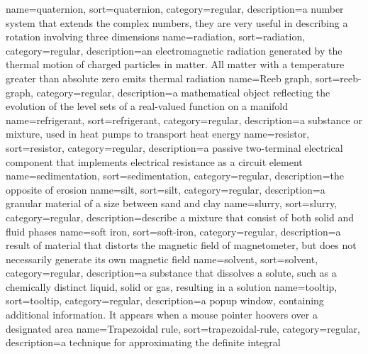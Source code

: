 %
{%
  name={quaternion},%
  sort={quaternion},%
  category={regular},%
  description={a number system that extends the complex numbers, they are very useful in describing a rotation involving three dimensions}%
}
%
{%
  name={radiation},%
  sort={radiation},%
  category={regular},%
  description={an electromagnetic radiation generated by the thermal motion of charged particles in matter. All matter with a temperature greater than absolute zero emits thermal radiation}%
}
%
{%
  name={Reeb graph},%
  sort={reeb-graph},%
  category={regular},%
  description={a mathematical object reflecting the evolution of the level sets of a real-valued function on a manifold}%
}
%
{%
  name={refrigerant},%
  sort={refrigerant},%
  category={regular},%
  description={a substance or mixture, used in heat pumps to transport heat energy}%
}
%
{%
  name={resistor},%
  sort={resistor},%
  category={regular},%
  description={a passive two-terminal electrical component that implements electrical resistance as a circuit element}%
}
%
{%
  name={sedimentation},%
  sort={sedimentation},%
  category={regular},%
  description={the opposite of erosion}%
}
%
{%
  name={silt},%
  sort={silt},%
  category={regular},%
  description={a granular material of a size between sand and clay}%
}
%
{%
  name={slurry},%
  sort={slurry},%
  category={regular},%
  description={describe a mixture that consist of both solid and fluid phases}%
}
%
{%
  name={soft iron},%
  sort={soft-iron},%
  category={regular},%
  description={a result of material that distorts the magnetic field of magnetometer, but does not necessarily generate its own magnetic field}%
}
%
{%
  name={solvent},%
  sort={solvent},%
  category={regular},%
  description={a substance that dissolves a solute, such as a chemically distinct liquid, solid or gas, resulting in a solution}%
}
%
{%
  name={tooltip},%
  sort={tooltip},%
  category={regular},%
  description={a popup window, containing additional information. It appears when a mouse pointer hoovers over a designated area}%
}
%
{%
  name={Trapezoidal rule},%
  sort={trapezoidal-rule},%
  category={regular},%
  description={a technique for approximating the definite integral}%
}
%
